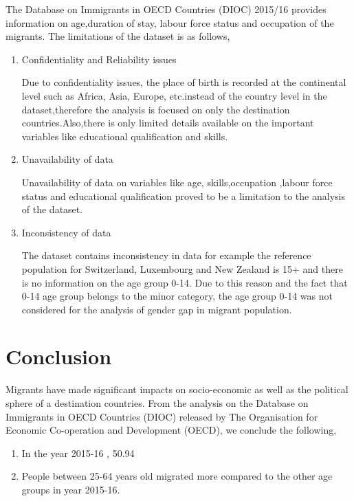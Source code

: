 \documentclass[11pt,a4paper,]{article}
\begin{document}
The Database on Immigrants in OECD Countries (DIOC) 2015/16 provides information on age,duration of stay, labour force status and occupation of the migrants. The limitations of the dataset is as follows,

\begin{enumerate}

   \item Confidentiality and Reliability issues 

Due to confidentiality issues, the place of birth is recorded at the continental level such as Africa, Asia, Europe, etc.instead of the country level in the dataset,therefore the analysis is focused on only the destination countries.Also,there is only limited details available on the important variables like educational qualification and skills. 

   \item Unavailability of data

Unavailability of data on variables like age, skills,occupation ,labour force status and educational qualification proved to be a limitation to the analysis of the dataset.

  \item  Inconsistency of data
 
 The dataset contains inconsistency in data for example the reference population for Switzerland, Luxembourg and New Zealand is 15+ and there is no information on the age group 0-14. Due to this reason and the fact that 0-14 age group belongs to the minor category, the age group 0-14  was not considered for the analysis of gender gap in migrant population.  
 
\end{enumerate}

\section*{Conclusion}

Migrants have made significant impacts on socio-economic as well as the political sphere of a destination countries. From the analysis on the Database on Immigrants in OECD Countries (DIOC) released by The Organisation for Economic Co-operation and Development (OECD), we conclude the following,

\begin{enumerate}

\item In the year 2015-16 , 50.94 %

\item People between 25-64 years old migrated more compared to the other age groups in year 2015-16. 

\end{enumerate}

\nocite{*}

\printbibliography
\end{document}
